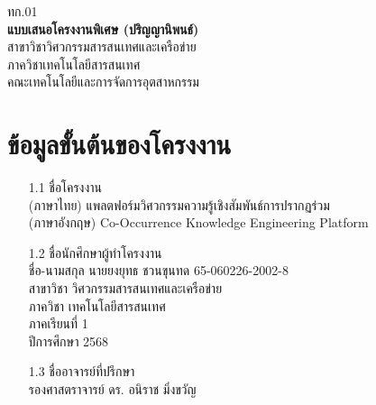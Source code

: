 \documentclass[12pt,a4paper]{article}
\newcommand{\textlight}[1]{{\thailightfont #1}}
\begin{document}
\begin{center}
\hfill\textlight{ทก.01}\\[1cm]
\large\textbf{แบบเสนอโครงงานพิเศษ (ปริญญานิพนธ์)}\\[0.3cm]
\normalsize\textlight{สาขาวิชาวิศวกรรมสารสนเทศและเครือข่าย}\\[0.1cm]
\normalsize\textlight{ภาควิชาเทคโนโลยีสารสนเทศ}\\[0.1cm]
\normalsize\textlight{คณะเทคโนโลยีและการจัดการอุตสาหกรรม}\\[0.1cm]
\end{center}

\thispagestyle{empty}
\vspace{0.5cm}

\section{ข้อมูลขั้นต้นของโครงงาน}
\begin{enumerate}[leftmargin=2cm]
\small
    \item[1.1] ชื่อโครงงาน
    \\ \textlight{(ภาษาไทย)} \hspace{0.5cm} {แพลตฟอร์มวิศวกรรมความรู้เชิงสัมพันธ์การปรากฏร่วม}
    \\ \textlight{(ภาษาอังกฤษ)} \hspace{0.04cm} {Co-Occurrence Knowledge Engineering Platform}

    \item[1.2] ชื่อนักศึกษาผู้ทำโครงงาน
    \\ \textlight{ชื่อ-นามสกุล} \hspace{0.4cm} {นายยงยุทธ ชวนขุนทด} {65-060226-2002-8}
    \\ \textlight{สาขาวิชา} \hspace{0.935cm} {วิศวกรรมสารสนเทศและเครือข่าย}
    \\ \textlight{ภาควิชา} \hspace{1.12cm} {เทคโนโลยีสารสนเทศ}
    \\ \textlight{ภาคเรียนที่} \hspace{0.7cm} {1}
    \\ \textlight{ปีการศึกษา} \hspace{0.67cm} {2568}

    \item[1.3] ชื่ออาจารย์ที่ปรึกษา
    \\ {รองศาสตราจารย์ ดร. อนิราช มิ่งขวัญ}
\end{enumerate}
\end{document}
